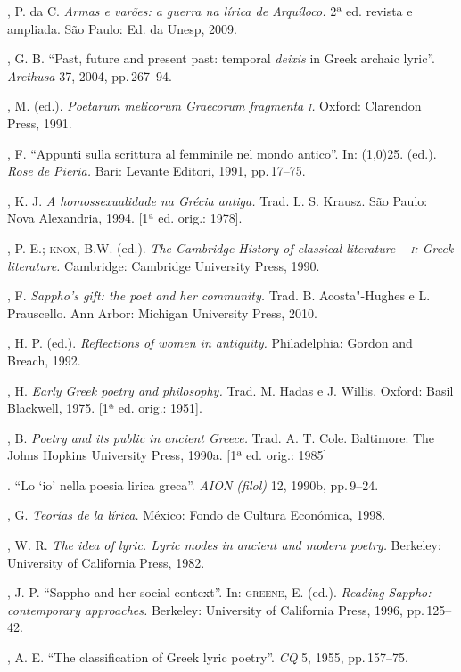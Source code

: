 \begin{bibliohedra}
, P. da C. \emph{Armas e varões: a guerra na
lírica de Arquíloco.} 2ª ed. revista e ampliada. São Paulo: Ed. da Unesp, 2009.

, G. B. “Past, future and present past: temporal
\emph{deixis} in Greek archaic lyric”. \emph{Arethusa} 37, 2004, pp.\,267--94.

, M. (ed.). \emph{Poetarum melicorum Graecorum fragmenta \textsc{i}.}
Oxford: Clarendon Press, 1991.

, F. “Appunti sulla scrittura al femminile nel mondo antico''.
In: \line(1,0){25}. (ed.). \emph{Rose} \emph{de Pieria.} Bari: Levante Editori,
1991, pp.\,17--75.

, K. J.  \emph{A homossexualidade na Grécia antiga.}
Trad. L. S. Krausz. São Paulo: Nova Alexandria, 1994. {[}1ª ed. orig.: 1978{]}.

, P. E.; \textsc{knox}, B.W. (ed.). \emph{The Cambridge History of
classical literature -- \textsc{i}: Greek literature.} Cambridge: Cambridge University
Press, 1990.

, F. \emph{Sappho’s gift: the poet and her community.} Trad.
B. Acosta"-Hughes e L. Prauscello. Ann Arbor: Michigan University Press, 2010.

, H. P. (ed.). \emph{Reflections of women in antiquity.}
Philadelphia: Gordon and Breach, 1992.

, H. \emph{Early Greek poetry and philosophy.} Trad. M. Hadas
e J. Willis. Oxford: Basil Blackwell, 1975. {[}1ª ed. orig.: 1951{]}. 

, B. \emph{Poetry and its public in ancient Greece.} Trad. A.
T. Cole. Baltimore: The Johns Hopkins University Press, 1990a.
{[}1ª ed. orig.: 1985{]}

\titidem. “Lo ‘io’ nella poesia lirica greca”. \emph{AION (filol)} 12,
1990b, pp.\,9--24.

, G. \emph{Teorías de la lírica.} México: Fondo de
Cultura Económica, 1998.

, W. R. \emph{The idea of lyric. Lyric modes in ancient and
modern poetry.} Berkeley: University of California Press, 1982.

, J. P. “Sappho and her social context”. In: \textsc{greene}, E.
(ed.). \emph{Reading Sappho: contemporary approaches.} Berkeley: University
of California Press, 1996, pp.\,125--42.

, A. E. “The classification of Greek lyric poetry”. \emph{CQ}
5, 1955, pp.\,157--75.


\end{bibliohedra}

